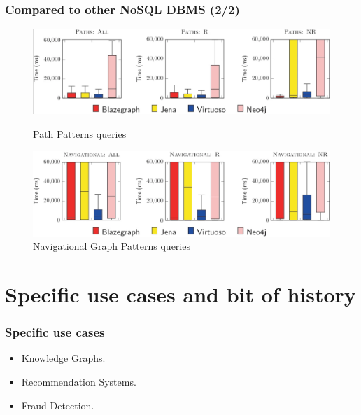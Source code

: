 \documentclass[aspectratio=169]{beamer}
\begin{document}
\begin{frame}
    \frametitle{Compared to other NoSQL DBMS (2/2)}

    \begin{figure}
        \begin{minipage}{0.48\textwidth}
            \centering
            \includegraphics[width=\linewidth]{benchWD3.png}
            \caption{Path Patterns queries}
            \label{fig:path}
        \end{minipage}\hfill
        \begin{minipage}{0.48\textwidth}
            \centering
            \includegraphics[width=\linewidth]{benchWD4.png}
            \caption{Navigational Graph Patterns queries}
            \label{fig:nav}
        \end{minipage}
    \end{figure}
    
\end{frame}


\section{Specific use cases and bit of history}

\begin{frame}
    \frametitle{Specific use cases}
	\begin{itemize}
		\item Knowledge Graphs.
		\item Recommendation Systems.
		\item Fraud Detection.
	\end{itemize}
\end{frame}
\end{document}
